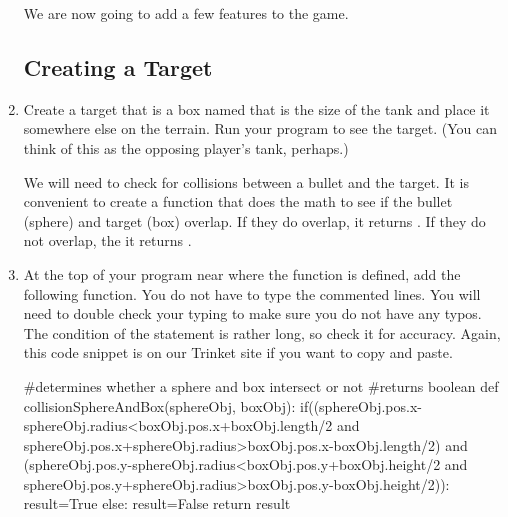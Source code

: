 \begin{enumerate}





We are now going to add a few features to the game.

\subsection*{Creating a Target}

	\item Create a target that is a box named  that is the size of the tank and place it somewhere else on the terrain. Run your program to see the target. (You can think of this as the opposing player's tank, perhaps.)
	
We will need to check for collisions between a bullet and the target. It is convenient to create a function that does the math to see if the bullet (sphere) and target (box) overlap. If they do overlap, it returns . If they do not overlap, the it returns .

	\item At the top of your program near where the  function is defined, add the following function. You do not have to type the commented lines. You will need to double check your typing to make sure you do not have any typos. The condition of the  statement is rather long, so check it for accuracy.  Again, this code snippet is on our Trinket site if you want to copy and paste.
	
\begin{myvpython}
#determines whether a sphere and box intersect or not
#returns boolean
def collisionSphereAndBox(sphereObj, boxObj):
    if((sphereObj.pos.x-sphereObj.radius<boxObj.pos.x+boxObj.length/2 and sphereObj.pos.x+sphereObj.radius>boxObj.pos.x-boxObj.length/2) and (sphereObj.pos.y-sphereObj.radius<boxObj.pos.y+boxObj.height/2 and sphereObj.pos.y+sphereObj.radius>boxObj.pos.y-boxObj.height/2)):
        result=True
    else:
        result=False
    return result
\end{myvpython}


\end{enumerate}

